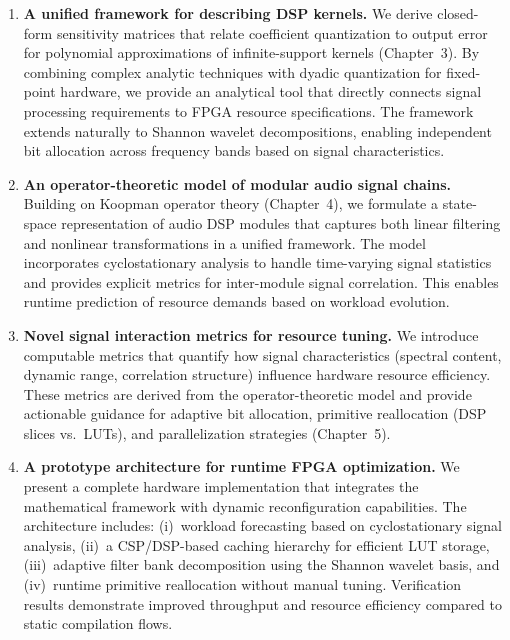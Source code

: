 \begin{enumerate}
\item \textbf{A unified framework for describing DSP kernels.}
We derive closed-form sensitivity matrices that relate coefficient quantization to output error for polynomial approximations of infinite-support kernels (Chapter~3). By combining complex analytic techniques with dyadic quantization for fixed-point hardware, we provide an analytical tool that directly connects signal processing requirements to FPGA resource specifications. The framework extends naturally to Shannon wavelet decompositions, enabling independent bit allocation across frequency bands based on signal characteristics.

\item \textbf{An operator-theoretic model of modular audio signal chains.}
Building on Koopman operator theory (Chapter~4), we formulate a state-space representation of audio DSP modules that captures both linear filtering and nonlinear transformations in a unified framework. The model incorporates cyclostationary analysis to handle time-varying signal statistics and provides explicit metrics for inter-module signal correlation. This enables runtime prediction of resource demands based on workload evolution.

\item \textbf{Novel signal interaction metrics for resource tuning.}
We introduce computable metrics that quantify how signal characteristics (spectral content, dynamic range, correlation structure) influence hardware resource efficiency. These metrics are derived from the operator-theoretic model and provide actionable guidance for adaptive bit allocation, primitive reallocation (DSP slices vs.~LUTs), and parallelization strategies (Chapter~5).

\item \textbf{A prototype architecture for runtime FPGA optimization.}
We present a complete hardware implementation that integrates the mathematical framework with dynamic reconfiguration capabilities. The architecture includes: (i)~workload forecasting based on cyclostationary signal analysis, (ii)~a CSP/DSP-based caching hierarchy for efficient LUT storage, (iii)~adaptive filter bank decomposition using the Shannon wavelet basis, and (iv)~runtime primitive reallocation without manual tuning. Verification results demonstrate improved throughput and resource efficiency compared to static compilation flows.
\end{enumerate}

